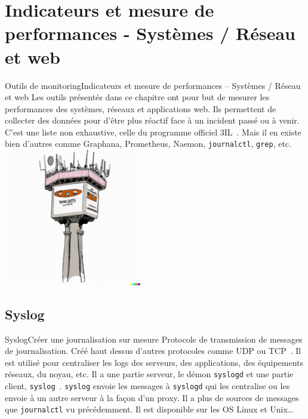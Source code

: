 \documentclass{beamer}
\begin{document}
    \section{Indicateurs et mesure de performances - Systèmes / Réseau et web}\label{sec:indicateurs-et-mesure-de-performances--systemes-/-reseau-et-web}

    \begin{frame}{Outils de monitoring}{Indicateurs et mesure de performances – Systèmes / Réseau et web}
        Les outils présentés dans ce chapitre ont pour but de mesurer les performances des systèmes, réseaux et applications web.
        Ils permettent de collecter des données pour d'être plus réactif face à un incident passé ou à venir.
        \bigbreak
        C'est une liste non exhaustive, celle du programme officiel 3IL~.
        Mais il en existe bien d'autres comme Graphana, Prometheus, Naemon, \lstinline{journalctl}, \lstinline{grep}, etc.
        \bigbreak
        \centering
        \includegraphics[width=6cm]{image/control-tower}
    \end{frame}

    \subsection{Syslog}\label{subsec:syslog}

    \begin{frame}{Syslog}{Créer une journalisation sur mesure}
        Protocole de transmission de messages de journalisation.
        Créé haut dessus d'autres protocoles comme UDP ou TCP~.
        \bigbreak
        Il est utilisé pour centraliser les logs des serveurs, des applications, des équipements réseaux, du noyau, etc.
        \bigbreak
        Il a une partie serveur, le démon \lstinline{syslogd} et une partie client, \lstinline{syslog}~.
        \lstinline{syslog} envoie les messages à \lstinline{syslogd} qui les centralise ou les envoie à un autre serveur à la façon d'un proxy.
        \bigbreak
        Il a plus de sources de messages que \lstinline{journalctl} vu précédemment.
        \bigbreak
        Il est disponible sur les OS Linux et Unix\ldots
    \end{frame}
\end{document}
